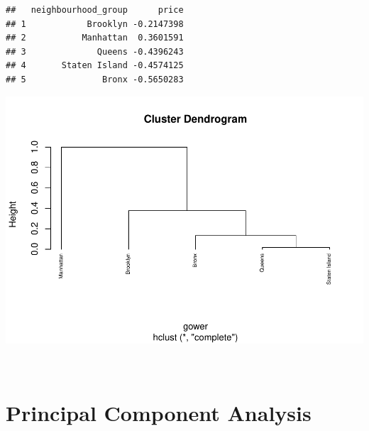 \documentclass[
]{article}
\newenvironment{Shaded}{\begin{snugshade}}{\end{snugshade}}
\newcommand{\DataTypeTok}[1]{\textcolor[rgb]{0.13,0.29,0.53}{#1}}
\newcommand{\DecValTok}[1]{\textcolor[rgb]{0.00,0.00,0.81}{#1}}
\newcommand{\FloatTok}[1]{\textcolor[rgb]{0.00,0.00,0.81}{#1}}
\newcommand{\KeywordTok}[1]{\textcolor[rgb]{0.13,0.29,0.53}{\textbf{#1}}}
\newcommand{\NormalTok}[1]{#1}
\newcommand{\OperatorTok}[1]{\textcolor[rgb]{0.81,0.36,0.00}{\textbf{#1}}}
\newcommand{\OtherTok}[1]{\textcolor[rgb]{0.56,0.35,0.01}{#1}}
\newcommand{\StringTok}[1]{\textcolor[rgb]{0.31,0.60,0.02}{#1}}
\begin{document}
\begin{verbatim}
##   neighbourhood_group      price
## 1            Brooklyn -0.2147398
## 2           Manhattan  0.3601591
## 3              Queens -0.4396243
## 4       Staten Island -0.4574125
## 5               Bronx -0.5650283
\end{verbatim}

\begin{Shaded}
\end{Shaded}

\includegraphics{project-code_files/figure-latex/unnamed-chunk-28-1.pdf}

~\\

\hypertarget{principal-component-analysis}{%
\section{Principal Component
Analysis}\label{principal-component-analysis}}
\end{document}
